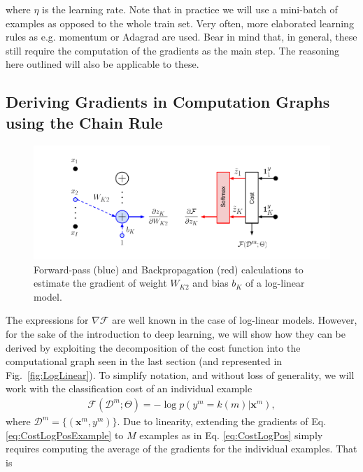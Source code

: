 \noindent where $\eta$ is the learning rate. Note that in practice we will use
a mini-batch of examples as opposed to the whole train set. Very often, more
elaborated learning rules as e.g. momentum or Adagrad are used. Bear in mind
that, in general, these still require the computation of the gradients as the
main step. The reasoning here outlined will also be applicable to these.  

\subsection{Deriving Gradients in Computation Graphs using the Chain Rule}

\begin{figure}[!h]
\centering
\includegraphics[scale=0.6]{figs/deep_learning/LogLin_color.pdf}
\caption{Forward-pass (blue) and Backpropagation (red) calculations to estimate the gradient of weight $W_{K2}$ and bias $b_K$ of a log-linear model.}
\label{fig:LogLinColor}
\end{figure}

The expressions for $\nabla\mathcal{F}$ are well known in the case of log-linear models. However, for
the sake of the introduction to deep learning, we will show how they can
be derived by exploiting the decomposition of the cost function into the computational
graph seen in the last section (and represented in Fig.~\ref{fig:LogLinear}). To simplify notation, and without loss of generality, we will work with the 
classification cost of an individual example 
%
\begin{align}
\mathcal{F}(\mathcal{D}^m;\Theta) 
= -\log p(y^m=k(m) | \mathbf{x}^m), 
\label{eq:CostLogPosExample}
\end{align}
%
where $\mathcal{D}^m=\{(\mathbf{x}^m, y^m)\}$. Due to linearity, extending the
gradients of Eq. \ref{eq:CostLogPosExample} to $M$ examples as in
Eq. \ref{eq:CostLogPos} simply requires computing the average of the gradients for
the individual examples. That is

